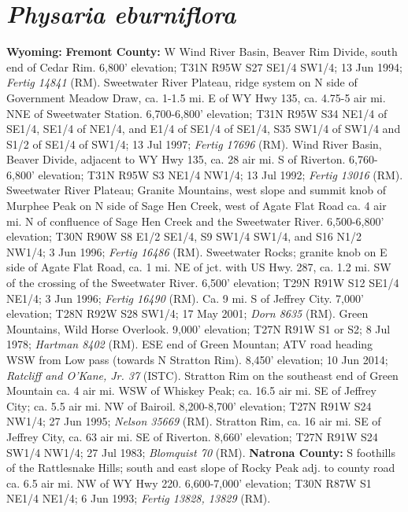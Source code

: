 \section*{\textit{Physaria eburniflora}}

  \textbf{Wyoming:}
  \textbf{Fremont County:}
W Wind River Basin, Beaver Rim Divide, south end of Cedar Rim. 6,800' elevation;
T31N R95W S27 SE1/4 SW1/4; 13 Jun 1994; \textit{Fertig 14841} (RM).
Sweetwater River Plateau, ridge system on N side of Government Meadow Draw, ca.
1-1.5 mi. E of WY Hwy 135, ca. 4.75-5 air mi. NNE of Sweetwater Station.
6,700-6,800' elevation; T31N R95W S34 NE1/4 of SE1/4, SE1/4 of NE1/4, and
E1/4 of SE1/4 of SE1/4, S35 SW1/4 of SW1/4 and S1/2 of SE1/4 of SW1/4;
13 Jul 1997; \textit{Fertig 17696} (RM).
Wind River Basin, Beaver Divide, adjacent to WY Hwy 135, ca. 28 air mi. S of
Riverton. 6,760-6,800' elevation; T31N R95W S3 NE1/4 NW1/4; 13 Jul 1992;
\textit{Fertig 13016} (RM).
Sweetwater River Plateau; Granite Mountains, west slope and summit knob of
Murphee Peak on N side of Sage Hen Creek, west of Agate Flat Road ca. 4 air mi.
N of confluence of Sage Hen Creek and the Sweetwater River.
6,500-6,800' elevation; T30N R90W S8 E1/2 SE1/4, S9 SW1/4 SW1/4, and
S16 N1/2 NW1/4; 3 Jun 1996; \textit{Fertig 16486} (RM).
Sweetwater Rocks; granite knob on E side of Agate Flat Road, ca. 1 mi. NE of
jct. with US Hwy. 287, ca. 1.2 mi. SW of the crossing of the Sweetwater River.
6,500' elevation; T29N R91W S12 SE1/4 NE1/4; 3 Jun 1996;
\textit{Fertig 16490} (RM).
Ca. 9 mi. S of Jeffrey City. 7,000' elevation; T28N R92W S28 SW1/4; 17 May 2001;
\textit{Dorn 8635} (RM).
Green Mountains, Wild Horse Overlook. 9,000' elevation; T27N R91W S1 or S2;
8 Jul 1978; \textit{Hartman 8402} (RM).
ESE end of Green Mountan; ATV road heading WSW from Low pass (towards N
Stratton Rim). 8,450' elevation; 10 Jun 2014;
\textit{Ratcliff and O'Kane, Jr. 37} (ISTC).
Stratton Rim on the southeast end of Green Mountain ca. 4 air mi. WSW of
Whiskey Peak; ca. 16.5 air mi. SE of Jeffrey City; ca. 5.5 air mi. NW of
Bairoil. 8,200-8,700' elevation; T27N R91W S24 NW1/4; 27 Jun 1995;
\textit{Nelson 35669} (RM).
Stratton Rim, ca. 16 air mi. SE of Jeffrey City, ca. 63 air mi. SE of Riverton.
8,660' elevation; T27N R91W S24 SW1/4 NW1/4; 27 Jul 1983;
\textit{Blomquist 70} (RM).
  \textbf{Natrona County:}
S foothills of the Rattlesnake Hills; south and east slope of Rocky Peak adj.
to county road ca. 6.5 air mi. NW of WY Hwy 220. 6,600-7,000' elevation;
T30N R87W S1 NE1/4 NE1/4; 6 Jun 1993; \textit{Fertig 13828, 13829} (RM).
